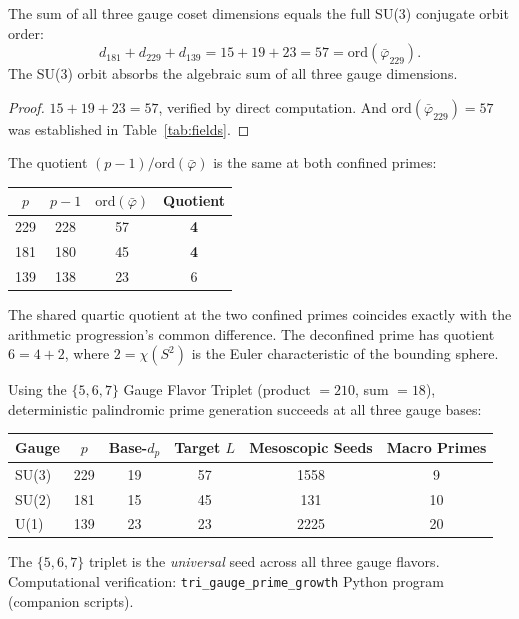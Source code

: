 \begin{theorem}
\label{thm:master_sum}
The sum of all three gauge coset dimensions equals the full SU(3) conjugate orbit order:
\[
d_{181} + d_{229} + d_{139} = 15 + 19 + 23 = 57 = \mathrm{ord}(\bar\varphi_{229}).
\]
The SU(3) orbit absorbs the algebraic sum of all three gauge dimensions.
\end{theorem}

\begin{proof}
$15 + 19 + 23 = 57$, verified by direct computation. And $\mathrm{ord}(\bar\varphi_{229}) = 57$ was established in Table~\ref{tab:fields}. \qedhere
\end{proof}

\begin{result}
The quotient $(p - 1)/\mathrm{ord}(\bar\varphi)$ is the same at both confined primes:
\begin{center}
\begin{tabular}{@{}cccc@{}}
\toprule
$p$ & $p-1$ & $\mathrm{ord}(\bar\varphi)$ & Quotient \\
\midrule
229 & 228 & 57 & \textbf{4} \\
181 & 180 & 45 & \textbf{4} \\
139 & 138 & 23 & 6 \\
\bottomrule
\end{tabular}
\end{center}
The shared quartic quotient at the two confined primes coincides exactly with the arithmetic progression's common difference. The deconfined prime has quotient $6 = 4 + 2$, where $2 = \chi(S^2)$ is the Euler characteristic of the bounding sphere.
\end{result}

\begin{result}
\label{res:tri_gauge_primes}
Using the $\{5, 6, 7\}$ Gauge Flavor Triplet (product $= 210$, sum $= 18$), deterministic palindromic prime generation succeeds at all three gauge bases:
\begin{center}
\begin{tabular}{@{}lccccc@{}}
\toprule
Gauge & $p$ & Base-$d_p$ & Target $L$ & Mesoscopic Seeds & Macro Primes \\
\midrule
SU(3) & 229 & 19 & 57 & 1558 & 9 \\
SU(2) & 181 & 15 & 45 & 131 & 10 \\
U(1) & 139 & 23 & 23 & 2225 & 20 \\
\bottomrule
\end{tabular}
\end{center}
The $\{5, 6, 7\}$ triplet is the \emph{universal} seed across all three gauge flavors. Computational verification: \texttt{tri\_gauge\_prime\_growth} Python program (companion scripts).
\end{result}

